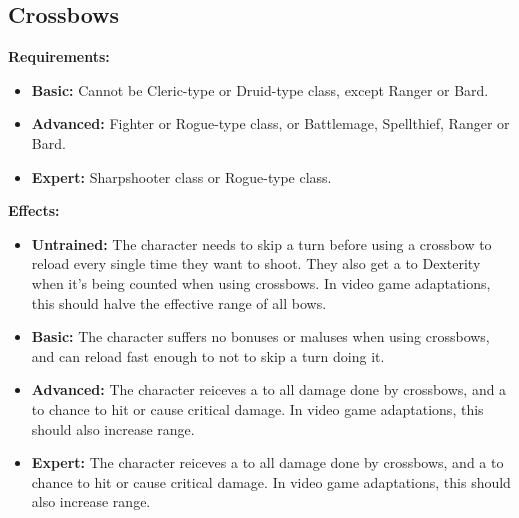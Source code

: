 \documentclass[openany,10pt,a4paper]{book}
\begin{document}
\subsection{Crossbows}
\begin{table}[!ht]
\centering
{}
\end{table}
\textbf{Requirements:}
\begin{itemize}
	\item \textbf{Basic:} Cannot be Cleric-type or Druid-type class, except Ranger or Bard.
	\item \textbf{Advanced:} Fighter or Rogue-type class, or Battlemage, Spellthief, Ranger or Bard.
	\item \textbf{Expert:} Sharpshooter class or Rogue-type class.
\end{itemize}
\textbf{Effects:}
\begin{itemize}
	\item \textbf{Untrained:} The character needs to skip a turn before using a crossbow to reload every single time they want to shoot. They also get a  to Dexterity when it's being counted when using crossbows. In video game adaptations, this should halve the effective range of all bows.
	\item \textbf{Basic:} The character suffers no bonuses or maluses when using crossbows, and can reload fast enough to not to skip a turn doing it.
	\item \textbf{Advanced:} The character reiceves a  to all damage done by crossbows, and a  to chance to hit or cause critical damage. In video game adaptations, this should also increase range.
	\item \textbf{Expert:} The character reiceves a  to all damage done by crossbows, and a  to chance to hit or cause critical damage. In video game adaptations, this should also increase range.
\end{itemize}\newpage
\end{document}
